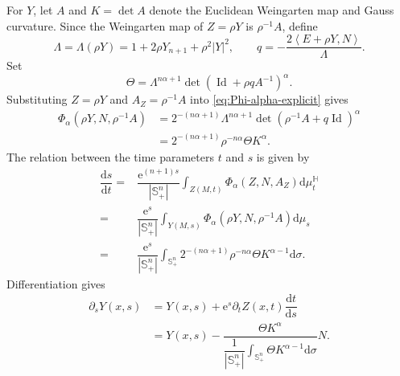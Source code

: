 \documentclass[11pt, reqno]{amsart}
\theoremstyle{remark}
\theoremstyle{definition}
\numberwithin{equation}{section}
\newcommand{\Id}{\operatorname{Id}}
\newcommand{\ip}[2]{\left\langle #1,#2\right\rangle}
\begin{document}
For $Y$, let $A$ and $K=\det A$ denote the Euclidean Weingarten map and Gauss
curvature.  Since the Weingarten map of $Z=\rho Y$ is $\rho^{-1}A$, define
\begin{equation*}
	\Lambda = \Lambda(\rho Y) = 1+2\rho Y_{n+1}+\rho^2|Y|^2,
	\qquad
	q=-\frac{2\ip{E+\rho Y}{N}}{\Lambda}.
\end{equation*}
Set
\begin{equation*}
	\Theta=\Lambda^{n\alpha+1}
	\det(\Id+\rho q A^{-1})^\alpha.
\end{equation*}
Substituting $Z=\rho Y$ and $A_Z=\rho^{-1}A$ into
\eqref{eq:Phi-alpha-explicit} gives
\begin{equation*}
	\begin{aligned}
		\Phi_\alpha(\rho Y,N,\rho^{-1}A)
		&=2^{-(n\alpha+1)}\Lambda^{n\alpha+1}
		\det(\rho^{-1}A+q \Id)^\alpha  \\
		&= 2^{-(n\alpha+1)}\rho^{-n\alpha}\Theta K^{\alpha}.
	\end{aligned}
\end{equation*}
The relation between the time parameters $t$ and $s$ is given by
\begin{align*}
	\dfrac{\mathrm{d}s}{\mathrm{d}t} = & \dfrac{\mathrm{e}^{(n+1)s}}{|\mathbb{S}_+^n|}\int_{Z(M,t)} \Phi_{\alpha}(Z,N,A_Z)\mathrm{d}\mu_t^{\mathbb{H}}\\
	= & \dfrac{\mathrm{e}^{s}}{|\mathbb{S}_+^n|} \int_{Y(M,s)} \Phi_{\alpha}(\rho Y, N, \rho^{-1}A) \mathrm{d}\mu_s\\
	=& \dfrac{\mathrm{e}^s}{|\mathbb{S}_+^n|}\int_{\mathbb{S}_+^n} 2^{-(n\alpha+1)}\rho^{-n\alpha}\Theta K^{\alpha-1} \mathrm{d}\sigma.
\end{align*}
Differentiation gives
\begin{align*}
	\partial_s Y(x,s) &= Y(x,s) + \mathrm{e}^{s}  \partial_{t} Z(x,t)  \dfrac{\mathrm{d}t}{\mathrm{d}s}\\
	&= Y(x,s) - \dfrac{\Theta K^{\alpha}}{\dfrac{1}{|\mathbb{S}_+^n|}\displaystyle\int_{\mathbb{S}_+^n}\Theta K^{\alpha-1}\mathrm{d}\sigma}N.
\end{align*}
\end{document}
